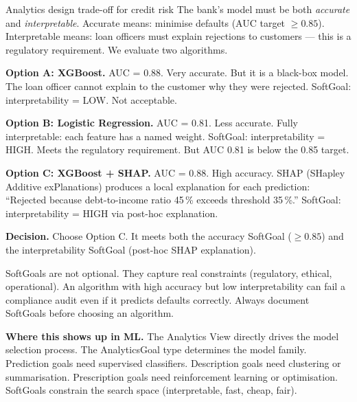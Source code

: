 \documentclass[a4paper,11pt]{article}
\begin{document}
\begin{worked}{Analytics design trade-off for credit risk}
The bank's model must be both \emph{accurate} and \emph{interpretable}.
Accurate means: minimise defaults (AUC target $\geq 0.85$).
Interpretable means: loan officers must explain rejections to customers ---
this is a regulatory requirement.
We evaluate two algorithms.
\begin{steps}
  \item \textbf{Option A: XGBoost.}
        AUC = 0.88. Very accurate.
        But it is a black-box model.
        The loan officer cannot explain to the customer why they were rejected.
        SoftGoal: interpretability = LOW. Not acceptable.
  \item \textbf{Option B: Logistic Regression.}
        AUC = 0.81. Less accurate.
        Fully interpretable: each feature has a named weight.
        SoftGoal: interpretability = HIGH. Meets the regulatory requirement.
        But AUC 0.81 is below the 0.85 target.
  \item \textbf{Option C: XGBoost + SHAP.}
        AUC = 0.88. High accuracy.
        SHAP (SHapley Additive exPlanations) produces a local explanation
        for each prediction: ``Rejected because debt-to-income ratio 45\,\%
        exceeds threshold 35\,\%.''
        SoftGoal: interpretability = HIGH via post-hoc explanation.
  \item \textbf{Decision.}
        Choose Option C. It meets both the accuracy SoftGoal ($\geq 0.85$)
        and the interpretability SoftGoal (post-hoc SHAP explanation).
\end{steps}
\end{worked}

\begin{watchout}
SoftGoals are not optional.
They capture real constraints (regulatory, ethical, operational).
An algorithm with high accuracy but low interpretability can fail a
compliance audit even if it predicts defaults correctly.
Always document SoftGoals before choosing an algorithm.
\end{watchout}

\noindent\textbf{Where this shows up in ML.}
The Analytics View directly drives the model selection process.
The AnalyticsGoal type determines the model family.
Prediction goals need supervised classifiers.
Description goals need clustering or summarisation.
Prescription goals need reinforcement learning or optimisation.
SoftGoals constrain the search space (interpretable, fast, cheap, fair).
\end{document}
